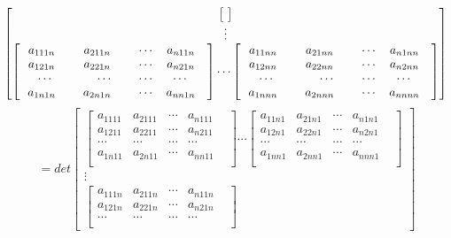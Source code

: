 \documentclass[twoside,a4paper,CCT]{cctart}   %
\begin{document}
\begin{list}{}
$$\begin{bmatrix}
\begin{bmatrix}
\begin{smallmatrix}
 \end{smallmatrix}\end{bmatrix}\\
\vdots\\
\begin{bmatrix}
  \ \ a_{111n}\ \ \ \ & a_{211n}\ \ \ \ &\cdots&a_{n11n}\\
  \ \ a_{121n}\ \ \ \ & a_{221n}\ \ \ \ &\cdots&a_{n21n}\\
  \cdots&\cdots&\cdots &\cdots& \\
  \ \ a_{1n1n}\ \ \ \ & a_{2n1n}\ \ \ \ &\cdots&a_{nn1n}\\
  \end{bmatrix}
\cdots
\begin{bmatrix}
  \ \ a_{11nn}\ \ \ \ & a_{21nn}\ \ \ \ &\cdots&a_{n1nn}\\
  \ \ a_{12nn}\ \ \ \ & a_{22nn}\ \ \ \ &\cdots&a_{n2nn}\\
  \cdots&\cdots&\cdots &\cdots& \\
   \ \ a_{1nnn}\ \ \ \ & a_{2nnn}\ \ \ \ &\cdots&a_{nnnn}\\
\end{bmatrix}
\end{bmatrix}\\
\\$$
$$=det\begin{bmatrix}
 \begin{bmatrix}
   a_{1111}& a_{2111}&\cdots&a_{n111}\\
   a_{1211}& a_{2211}&\cdots&a_{n211}\\
  \cdots&\cdots&\cdots &\cdots& \\
a_{1n11}& a_{2n11}&\cdots&a_{nn11}\\
\end{bmatrix}
\cdots
\begin{bmatrix}
  a_{11n1}& a_{21n1}&\cdots&a_{n1n1}\\
  a_{12n1}& a_{22n1}&\cdots&a_{n2n1}\\
  \cdots&\cdots&\cdots &\cdots& \\
 a_{1nn1}& a_{2nn1}&\cdots&a_{nnn1}\\
 \end{bmatrix}\\
\vdots\\
\begin{bmatrix}
  a_{111n}& a_{211n}&\cdots&a_{n11n}\\
  a_{121n}& a_{221n}&\cdots&a_{n21n}\\
  \cdots&\cdots&\cdots &\cdots& \\

\end{bmatrix}
\end{bmatrix}$$
\end{list}
\end{document}
